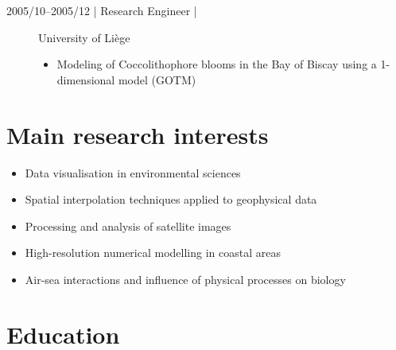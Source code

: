 \documentclass[11pt,a4paper,svgnames]{article}
\begin{document}
\begin{description}
\item[2005/10--2005/12 | Research Engineer |] University of Li\`{e}ge

\parbox{.65\textwidth}{
\begin{itemize}
\item Modeling of Coccolithophore blooms in the Bay of Biscay using a 1-dimensional model (GOTM)
\end{itemize}
}\hspace{.5cm}\parbox{.25\textwidth}{
}
\end{description}


\section{Main research interests}

\begin{itemize}
\item {Data visualisation in environmental sciences}
\item {Spatial interpolation techniques applied to geophysical data}
\item {Processing and analysis of satellite images}
\item {High-resolution numerical modelling in coastal areas}
\item {Air-sea interactions and influence of physical processes on biology}
\end{itemize}
%


\section{Education}
\end{document}
